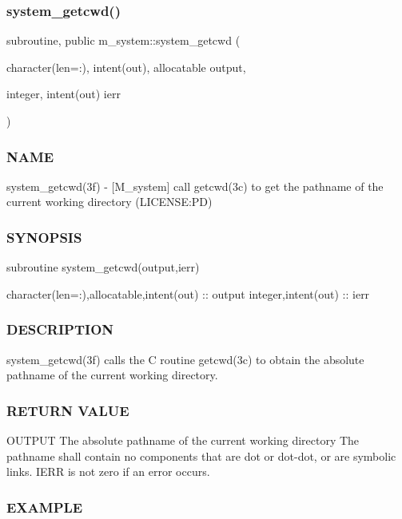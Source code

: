 \subsubsection{\texorpdfstring{system\+\_\+getcwd()}{system\_getcwd()}}
{\footnotesize\ttfamily subroutine, public m\+\_\+system\+::system\+\_\+getcwd (\begin{DoxyParamCaption}\item[{character(len=\+:), intent(out), allocatable}]{output,  }\item[{integer, intent(out)}]{ierr }\end{DoxyParamCaption})}



\subsubsection*{N\+A\+ME}

system\+\_\+getcwd(3f) -\/ \mbox{[}M\+\_\+system\mbox{]} call getcwd(3c) to get the pathname of the current working directory (L\+I\+C\+E\+N\+SE\+:PD) \subsubsection*{S\+Y\+N\+O\+P\+S\+IS}

subroutine system\+\_\+getcwd(output,ierr)

character(len=\+:),allocatable,intent(out) \+:\+: output integer,intent(out) \+:\+: ierr \subsubsection*{D\+E\+S\+C\+R\+I\+P\+T\+I\+ON}

system\+\_\+getcwd(3f) calls the C routine getcwd(3c) to obtain the absolute pathname of the current working directory.

\subsubsection*{R\+E\+T\+U\+RN V\+A\+L\+UE}

O\+U\+T\+P\+UT The absolute pathname of the current working directory The pathname shall contain no components that are dot or dot-\/dot, or are symbolic links. I\+E\+RR is not zero if an error occurs.

\subsubsection*{E\+X\+A\+M\+P\+LE}


